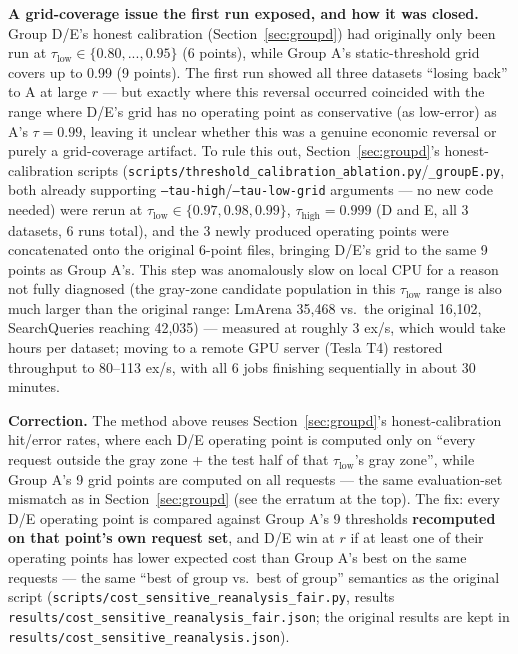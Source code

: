\documentclass[11pt]{article}
\newcommand{\taulow}{\ensuremath{\tau_{\text{low}}}}
\newcommand{\tauhigh}{\ensuremath{\tau_{\text{high}}}}
\begin{document}
\textbf{A grid-coverage issue the first run exposed, and how it was closed.} Group D/E's honest calibration (Section~\ref{sec:groupd}) had originally only been run at $\taulow \in \{0.80, ..., 0.95\}$ (6 points), while Group A's static-threshold grid covers up to 0.99 (9 points). The first run showed all three datasets ``losing back'' to A at large $r$ --- but exactly where this reversal occurred coincided with the range where D/E's grid has no operating point as conservative (as low-error) as A's $\tau=0.99$, leaving it unclear whether this was a genuine economic reversal or purely a grid-coverage artifact. To rule this out, Section~\ref{sec:groupd}'s honest-calibration scripts (\texttt{scripts/\allowbreak{}threshold\_\allowbreak{}calibration\_\allowbreak{}ablation.\allowbreak{}py}/\texttt{\_\allowbreak{}group\allowbreak{}E.\allowbreak{}py}, both already supporting \texttt{--tau-high}/\texttt{--tau-low-grid} arguments --- no new code needed) were rerun at $\taulow \in \{0.97, 0.98, 0.99\}$, $\tauhigh=0.999$ (D and E, all 3 datasets, 6 runs total), and the 3 newly produced operating points were concatenated onto the original 6-point files, bringing D/E's grid to the same 9 points as Group A's. This step was anomalously slow on local CPU for a reason not fully diagnosed (the gray-zone candidate population in this $\taulow$ range is also much larger than the original range: LmArena 35{,}468 vs.\ the original 16{,}102, SearchQueries reaching 42{,}035) --- measured at roughly 3 ex/s, which would take hours per dataset; moving to a remote GPU server (Tesla T4) restored throughput to 80--113 ex/s, with all 6 jobs finishing sequentially in about 30 minutes.

\textbf{Correction.} The method above reuses Section~\ref{sec:groupd}'s honest-calibration hit/error rates, where each D/E operating point is computed only on ``every request outside the gray zone + the test half of that $\taulow$'s gray zone'', while Group A's 9 grid points are computed on all requests --- the same evaluation-set mismatch as in Section~\ref{sec:groupd} (see the erratum at the top). The fix: every D/E operating point is compared against Group A's 9 thresholds \textbf{recomputed on that point's own request set}, and D/E win at $r$ if at least one of their operating points has lower expected cost than Group A's best on the same requests --- the same ``best of group vs.\ best of group'' semantics as the original script (\texttt{scripts/\allowbreak{}cost\_\allowbreak{}sensitive\_\allowbreak{}reanalysis\_\allowbreak{}fair.\allowbreak{}py}, results \texttt{results/\allowbreak{}cost\_\allowbreak{}sensitive\_\allowbreak{}reanalysis\_\allowbreak{}fair.\allowbreak{}json}; the original results are kept in \texttt{results/\allowbreak{}cost\_\allowbreak{}sensitive\_\allowbreak{}reanalysis.\allowbreak{}json}).
\end{document}
